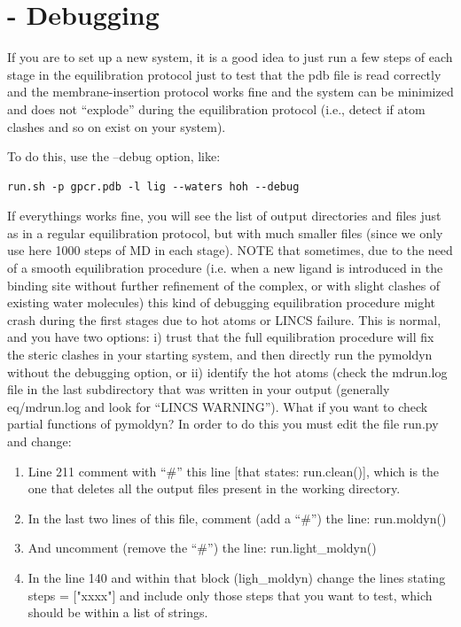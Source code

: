 \documentclass[10pt, oneside, pdftex]{article}
\begin{document}
\section*{ - Debugging} 
If you are to set up a new system, it is a good idea to just
run a  few steps of each  stage in the equilibration  protocol just to
test that  the pdb file  is read correctly and  the membrane-insertion
protocol  works fine  and the  system can  be minimized  and  does not
``explode''  during the  equilibration  protocol (i.e.,  detect if  atom
clashes and so on exist on your system).

To do this, use the --debug option, like:
\begin{Verbatim}
run.sh -p gpcr.pdb -l lig --waters hoh --debug 
\end{Verbatim}

If everythings works fine, you will see the list of output directories
and files just  as in a regular equilibration  protocol, but with much
smaller files (since we only use here 1000 steps of MD in each stage).
NOTE  that  sometimes, due  to  the  need  of a  smooth  equilibration
procedure (i.e.  when a new ligand  is introduced in  the binding site
without further refinement  of the complex, or with  slight clashes of
existing  water  molecules)   this  kind  of  debugging  equilibration
procedure  might crash during  the first  stages due  to hot  atoms or
LINCS failure. This is normal, and you have two options: i) trust that
the full equilibration  procedure will fix the steric  clashes in your
starting  system,  and then  directly  run  the  pymoldyn without  the
debugging option, or  ii) identify the hot atoms  (check the mdrun.log
file  in  the  last  subdirectory  that was  written  in  your  output
(generally eq/mdrun.log  and look for  ``LINCS WARNING'').  What  if you
want to check partial functions of  pymoldyn?  In order to do this you
must edit  the file run.py  and change: 
\begin{enumerate}
\item{Line 211 comment  with ``\#''
this line  [that states: run.clean()],  which is the one  that deletes
all the output files present in the working directory.}
\item{In the  last two  lines of  this file, comment  (add a ``\#'') the
  line: run.moldyn()}
\item{And uncomment (remove the ``\#'') the line: run.light\_moldyn()}
\item{In the line  140 and within that block  (ligh\_moldyn) change the
  lines stating steps = ["xxxx"] and include only those steps that you
  want to test, which should be within a list of strings.}
\end{enumerate}
\end{document}
